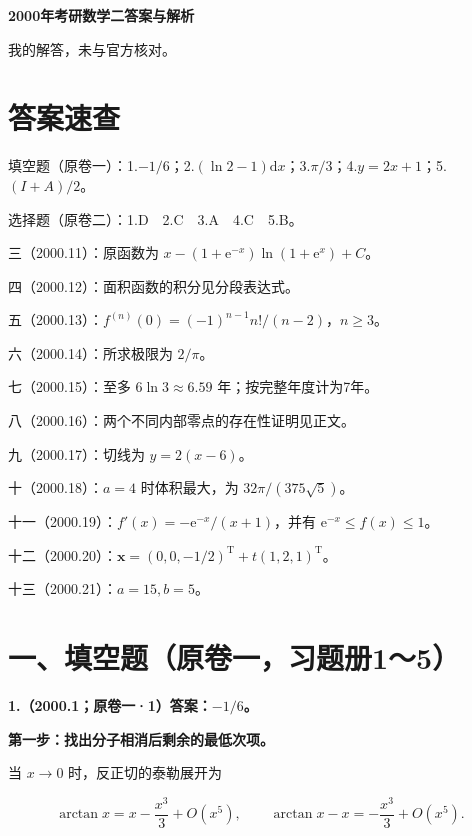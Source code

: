 \documentclass[UTF8,11pt,fontset=windows]{ctexart}
\begin{document}
{\LARGE\bfseries 2000年考研数学二答案与解析\par}\vspace{6pt}

\begingroup\color{gray}我的解答，未与官方核对。\par\endgroup

\section*{答案速查}

\begingroup\color{gray}填空题（原卷一）：1.$-1/6$；2.$(\ln2-1)\mathrm dx$；3.$\pi/3$；4.$y=2x+1$；5.$(I+A)/2$。\par\endgroup

\begingroup\color{gray}选择题（原卷二）：1.D　2.C　3.A　4.C　5.B。\par\endgroup

三（2000.11）：原函数为 $x-(1+\mathrm e^{-x})\ln(1+\mathrm e^x)+C$。

四（2000.12）：面积函数的积分见分段表达式。

五（2000.13）：$f^{(n)}(0)=(-1)^{n-1}n!/(n-2)$，$n\ge3$。

六（2000.14）：所求极限为 $2/\pi$。

七（2000.15）：至多 $6\ln3\approx6.59$ 年；按完整年度计为7年。

八（2000.16）：两个不同内部零点的存在性证明见正文。

九（2000.17）：切线为 $y=2(x-6)$。

十（2000.18）：$a=4$ 时体积最大，为 $32\pi/(375\sqrt5)$。

十一（2000.19）：$f'(x)=-\mathrm e^{-x}/(x+1)$，并有 $\mathrm e^{-x}\le f(x)\le1$。

十二（2000.20）：$\boldsymbol x=(0,0,-1/2)^{\mathrm T}+t(1,2,1)^{\mathrm T}$。

十三（2000.21）：$a=15,b=5$。

\clearpage

\section*{一、填空题（原卷一，习题册1～5）}

\textbf{1.（2000.1；原卷一·1）答案：$-1/6$。}

\textbf{第一步：找出分子相消后剩余的最低次项。}

当 $x\to0$ 时，反正切的泰勒展开为

$$
\arctan x=x-\frac{x^3}{3}+O(x^5),
\qquad \arctan x-x=-\frac{x^3}{3}+O(x^5).
$$
\end{document}
